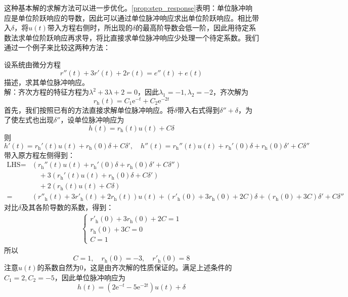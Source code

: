 这种基本解的求解方法可以进一步优化。\cref{prop:step_response}表明：单位脉冲响应是单位阶跃响应的导数，因此可以通过单位脉冲响应求出单位阶跃响应。相比带入$\delta$，将$u(t)$带入方程右侧时，所出现的$\delta$的最高阶导数会低一阶，因此用待定系数法求单位阶跃响应再求导，将比直接求单位脉冲响应少处理一个待定系数。我们通过一个例子来比较这两种方法：
\begin{example}
    设系统由微分方程\[r''(t)+3r'(t)+2r(t)=e''(t)+e(t)\]描述，求其单位脉冲响应。\\
    解：齐次方程的特征方程为$\lambda^2+3\lambda+2=0$，因此$\lambda_1=-1,\lambda_2=-2$，齐次解为$$r_{\text{h}}(t)=C_1 \mathrm{e}^{-t}+C_2 \mathrm{e}^{-2t}$$
    首先，我们按照已有的方法直接求解单位脉冲响应。将$\delta$带入右式得到$\delta''+\delta$，为了使左式也出现$\delta''$，设单位脉冲响应为$$h(t)=r_{\text{h}}(t)u(t)+C\delta$$
    则$$h'(t)=r_{\text{h}}'(t)u(t)+r_{\text{h}}(0)\delta+C\delta',\quad h''(t)=r_{\text{h}}''(t)u(t)+r_{\text{h}}'(0)\delta+r_{\text{h}}(0)\delta'+C\delta''$$
    带入原方程左侧得到：\begin{align*}
        \text{LHS}=&\left(r_{\text{h}}''(t)u(t)+r_{\text{h}}'(0)\delta+r_{\text{h}}(0)\delta'+C\delta''\right)\\
        &\quad+3\left(r_{\text{h}}'(t)u(t)+r_{\text{h}}(0)\delta+C\delta'\right)\\
        &\quad+2\left(r_{\text{h}}(t)u(t)+C\delta\right)\\
        =&\left(r''_{\text{h}}(t)+3r'_{\text{h}}(t)+2r_{\text{h}}(t)\right)u(t)+\left(r'_{\text{h}}(0)+3r_{\text{h}}(0)+2C\right)\delta+\left(r_{\text{h}}(0)+3C\right)\delta'+C\delta''
    \end{align*}
    对比$\delta$及其各阶导数的系数，得到：\begin{align*}
        \begin{cases}
            r'_{\text{h}}(0)+3r_{\text{h}}(0)+2C=1\\
            r_{\text{h}}(0)+3C=0\\
            C=1
        \end{cases}
    \end{align*}
    所以$$C=1,\quad r_{\text{h}}(0)=-3,\quad r'_{\text{h}}(0)=8$$
    注意$u(t)$的系数自然为0，这是由齐次解的性质保证的。满足上述条件的$C_1=2,C_2=-5$，因此单位脉冲响应为
    $$h(t)=\left(2\mathrm{e}^{-t}-5\mathrm{e}^{-2t}\right)u(t)+\delta$$


\end{example}
